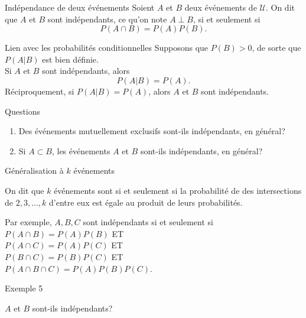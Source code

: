 \documentclass{BeamerTemplate}
\newcommand{\cibleReponse}{}
\newcommand{\lienreponse}[1]{\gdef\cibleReponse{#1}}
\begin{document}
\begin{frame}[t]
 \begin{Boite}{Indépendance de deux événements}
  Soient $A$ et $B$ deux événements de $\mathcal{U}$. On dit que $A$ et $B$
  sont \alert{indépendants, ce qu'on note $A\perp B$}, si et seulement si
  $$P(A\cap B) = P(A)P(B).$$
 \end{Boite}

    \begin{Boite}{Lien avec les probabilités conditionnelles}
   Supposons que $P(B)>0$, de sorte que $P(A|B)$ est bien définie.\\
   \alert{Si $A$ et $B$ sont indépendants}, alors
   $$P(A|B)=P(A).$$
   Réciproquement, si $P(A|B)=P(A)$, alors $A$ et $B$ sont indépendants.
  \end{Boite}
\end{frame}

\begin{frame}[t]{Questions}
 \begin{enumerate}\itemsep 2cm
 \item Des événements mutuellement exclusifs sont-ils indépendants, en général?
 \item Si $A\subset B$, les événements $A$ et $B$ sont-ils indépendants, en général?
\end{enumerate}
\end{frame}

\begin{frame}[t]{Généralisation à $k$ événements}
 \begin{defn}{}
  On dit que $k$ événements sont  si et seulement si la probabilité de  des intersections
  de $2,3,\ldots,k$ d'entre eux est égale au produit de leurs probabilités.
 \end{defn}

 \medskip
 Par exemple, $A,B,C$ sont indépendants si et seulement si \\
 $P(A\cap B)=P(A)P(B)$ ET \\
 $P(A\cap C)=P(A)P(C)$ ET \\
 $P(B\cap C)=P(B)P(C)$ ET \\
 $P(A\cap B\cap C)=P(A)P(B)P(C)$.
\end{frame}

\begin{frame}[t,label=ex5]{Exemple 5}

$A$ et $B$ sont-ils indépendants?

\begin{center}
\end{center}

\lienreponse{rep-ex1}
\end{frame}
\end{document}
